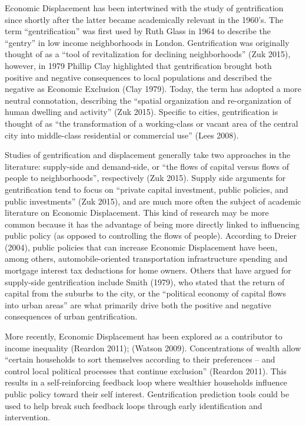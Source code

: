 \documentclass[12pt,]{article}
\begin{document}
Economic Displacement has been intertwined with the study of
gentrification since shortly after the latter became academically
relevant in the 1960's. The term ``gentrification'' was first used by
Ruth Glass in 1964 to describe the ``gentry'' in low income
neighborhoods in London. Gentrification was originally thought of as a
``tool of revitalization for declining neighborhoods'' (Zuk 2015),
however, in 1979 Phillip Clay highlighted that gentrification brought
both positive and negative consequences to local populations and
described the negative as Economic Exclusion (Clay 1979). Today, the
term has adopted a more neutral connotation, describing the ``spatial
organization and re-organization of human dwelling and activity'' (Zuk
2015). Specific to cities, gentrification is thought of as ``the
transformation of a working-class or vacant area of the central city
into middle-class residential or commercial use'' (Lees 2008).

Studies of gentrification and displacement generally take two approaches
in the literature: supply-side and demand-side, or ``the flows of
capital versus flows of people to neighborhoods'', respectively (Zuk
2015). Supply side arguments for gentrification tend to focus on
``private capital investment, public policies, and public investments''
(Zuk 2015), and are much more often the subject of academic literature
on Economic Displacement. This kind of research may be more common
because it has the advantage of being more directly linked to
influencing public policy (as opposed to controlling the flows of
people). According to Dreier (2004), public policies that can increase
Economic Displacement have been, among others, automobile-oriented
transportation infrastructure spending and mortgage interest tax
deductions for home owners. Others that have argued for supply-side
gentrification include Smith (1979), who stated that the return of
capital from the suburbs to the city, or the ``political economy of
capital flows into urban areas'' are what primarily drive both the
positive and negative consequences of urban gentrification.

More recently, Economic Displacement has been explored as a contributor
to income inequality (Reardon 2011); (Watson 2009). Concentrations of
wealth allow ``certain households to sort themselves according to their
preferences -- and control local political processes that continue
exclusion'' (Reardon 2011). This results in a self-reinforcing feedback
loop where wealthier households influence public policy toward their
self interest. Gentrification prediction tools could be used to help
break such feedback loops through early identification and intervention.
\end{document}
